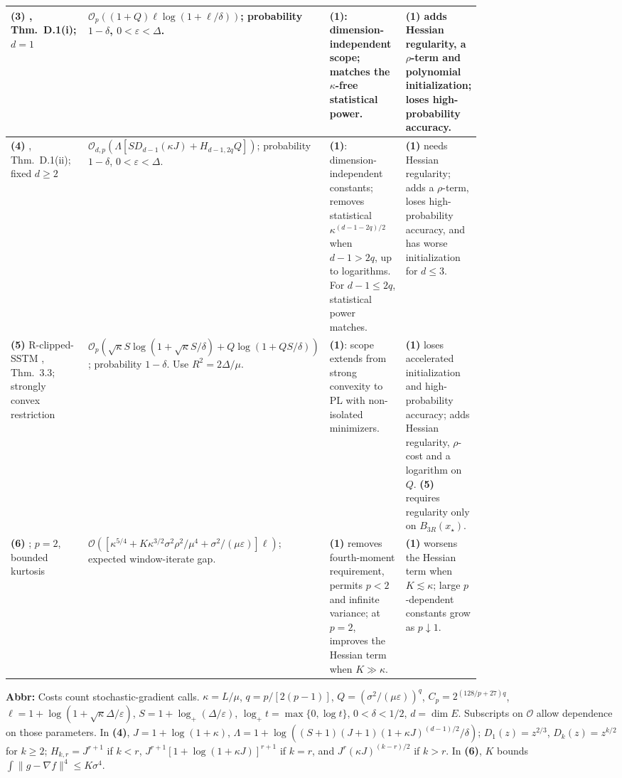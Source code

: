\begin{table}[tp]
\begin{threeparttable}
\begin{tabularx}{\linewidth}{@{}>{\raggedright\arraybackslash}p{0.20\linewidth}>{\raggedright\arraybackslash}p{0.32\linewidth}>{\raggedright\arraybackslash}p{0.25\linewidth}>{\raggedright\arraybackslash}X@{}}
\midrule
\textbf{(3)} \citep{htplOu2026v2}, Thm.~D.1(i); $d=1$ & $\mathcal{O}_p\!\left((1+Q)\ell\log(1+\ell/\delta)\right)$; probability $1-\delta$, $0<\varepsilon<\Delta$. & \textbf{(1)}: dimension-independent scope; matches the $\kappa$-free statistical power. & \textbf{(1)} adds Hessian regularity, a $\rho$-term and polynomial initialization; loses high-probability accuracy. \\
\midrule
\textbf{(4)} \citep{htplOu2026v2}, Thm.~D.1(ii); fixed $d\geq2$ & $\mathcal{O}_{d,p}\!\left(\Lambda[SD_{d-1}(\kappa J)+H_{d-1,2q}Q]\right)$; probability $1-\delta$, $0<\varepsilon<\Delta$. & \textbf{(1)}: dimension-independent constants; removes statistical $\kappa^{(d-1-2q)/2}$ when $d-1>2q$, up to logarithms. For $d-1\leq2q$, statistical power matches. & \textbf{(1)} needs Hessian regularity; adds a $\rho$-term, loses high-probability accuracy, and has worse initialization for $d\leq3$. \\
\midrule
\textbf{(5)} R-clipped-SSTM \citep{htplSadiev2023}, Thm.~3.3; strongly convex restriction & $\mathcal{O}_p\!\left(\sqrt\kappa S\log(1+\sqrt\kappa S/\delta)+Q\log(1+QS/\delta)\right)$; probability $1-\delta$. Use $R^2=2\Delta/\mu$. & \textbf{(1)}: scope extends from strong convexity to PL with non-isolated minimizers. & \textbf{(1)} loses accelerated initialization and high-probability accuracy; adds Hessian regularity, $\rho$-cost and a logarithm on $Q$. \textbf{(5)} requires regularity only on $B_{3R}(x_\star)$. \\
\midrule
\textbf{(6)} \citep{htplSibling}; $p=2$, bounded kurtosis & $\mathcal{O}\!\left([\kappa^{5/4}+K\kappa^{3/2}\sigma^2\rho^2/\mu^4+\sigma^2/(\mu\varepsilon)]\ell\right)$; expected window-iterate gap. & \textbf{(1)} removes fourth-moment requirement, permits $p<2$ and infinite variance; at $p=2$, improves the Hessian term when $K\gg\kappa$. & \textbf{(1)} worsens the Hessian term when $K\lesssim\kappa$; large $p$-dependent constants grow as $p\downarrow1$. \\
\bottomrule
\end{tabularx}
\begin{tablenotes}[flushleft]\footnotesize
\item[] \textbf{Abbr:} Costs count stochastic-gradient calls. $\kappa=L/\mu$, $q=p/[2(p-1)]$, $Q=(\sigma^2/(\mu\varepsilon))^q$, $C_p=2^{(128/p+27)q}$, $\ell=1+\log(1+\sqrt\kappa\Delta/\varepsilon)$, $S=1+\log_+(\Delta/\varepsilon)$, $\log_+t=\max\{0,\log t\}$, $0<\delta<1/2$, $d=\dim E$. Subscripts on $\mathcal{O}$ allow dependence on those parameters. In \textbf{(4)}, $J=1+\log(1+\kappa)$, $\Lambda=1+\log((S+1)(J+1)(1+\kappa J)^{(d-1)/2}/\delta)$; $D_1(z)=z^{2/3}$, $D_k(z)=z^{k/2}$ for $k\geq2$; $H_{k,r}=J^{r+1}$ if $k<r$, $J^{r+1}[1+\log(1+\kappa J)]^{r+1}$ if $k=r$, and $J^r(\kappa J)^{(k-r)/2}$ if $k>r$. In \textbf{(6)}, $K$ bounds $\int\|g-\nabla f\|^4\leq K\sigma^4$.
\end{tablenotes}
\end{threeparttable}
\end{table}
\clearpage

